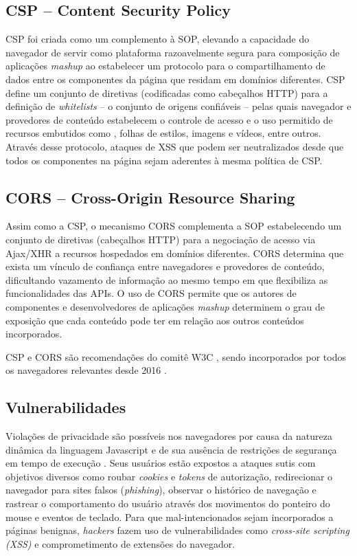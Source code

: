 \subsection{CSP -- Content Security Policy}
CSP foi criada como um complemento à SOP, elevando a capacidade do navegador de servir como plataforma razoavelmente segura para composição de aplicações \textit{mashup} ao estabelecer um protocolo para o compartilhamento de dados entre os componentes da página que residam em domínios diferentes. CSP define um conjunto de diretivas (codificadas como cabeçalhos HTTP) para a definição de \textit{whitelists} -- o conjunto de origens confiáveis -- pelas quais navegador e provedores de conteúdo estabelecem o controle de acesso e o uso permitido de recursos embutidos como {\scripts}, folhas de estilos, imagens e vídeos, entre outros. Através desse protocolo, ataques de XSS que podem ser neutralizados desde que todos os componentes na página sejam aderentes à mesma política de CSP.

\subsection{CORS -- Cross-Origin Resource Sharing}
Assim como a CSP, o mecanismo CORS \cite{W3C:CORS} complementa a SOP estabelecendo um conjunto de diretivas (cabeçalhos HTTP) para a negociação de acesso via Ajax/XHR a recursos hospedados em domínios diferentes. CORS determina que exista um vínculo de confiança entre navegadores e provedores de conteúdo, dificultando vazamento de informação ao mesmo tempo em que flexibiliza as funcionalidades das APIs. O uso de CORS permite que os autores de componentes e desenvolvedores de aplicações \textit{mashup} determinem o grau de exposição que cada conteúdo pode ter em relação aos outros conteúdos incorporados.

CSP e CORS são recomendações do comitê W3C \cite{W3C:CSP} \cite{W3C:CORS}, sendo incorporados por todos os navegadores relevantes desde 2016 \cite{CanIUse:CSP} \cite{CanIUse:CORS}.

\subsection{Vulnerabilidades}
Violações de privacidade são possíveis nos navegadores por causa da natureza dinâmica da linguagem Javascript e de sua ausência de restrições de segurança em tempo de execução \cite{Jang2010}. Seus usuários estão expostos a ataques sutis com objetivos diversos como roubar \textit{cookies} e \textit{tokens} de autorização, redirecionar o navegador para sites falsos (\textit{phishing}), observar o histórico de navegação e rastrear o comportamento do usuário através dos movimentos do ponteiro do mouse e eventos de teclado. Para que {\scripts} mal-intencionados sejam incorporados a páginas benignas, \textit{hackers} fazem uso de vulnerabilidades como \textit{cross-site scripting (XSS)} \cite{OWASP:XSS} e comprometimento de extensões \cite{Heule2015_Most_Dangerous_Code} do navegador.


